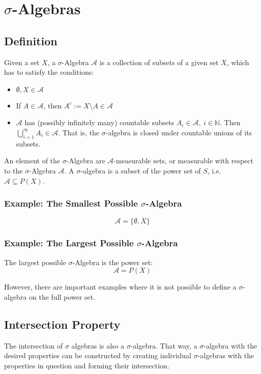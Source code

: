 \section{$\sigma$-Algebras}

\subsection{Definition}
Given a set $X$, a $\sigma$-Algebra $\mathscr{A}$ is a collection of subsets of a given set $X$, which has to satisfy the conditions:


\begin{itemize}
\item $\emptyset, X \in \mathscr{A}$
\item If $A\in\mathscr{A}$, then $A^c := X\setminus A \in \mathscr{A}$
\item $\mathscr{A}$ has (possibly infinitely many) countable subsets $A_i \in \mathscr{A},\ i \in \mathbb{N}$. Then $\bigcup_{i=1}^{\infty}A_i \in \mathscr{A}$. That is, the $\sigma$-algebra is closed under countable unions of its subsets. 
\end{itemize}

An element of the $\sigma$-Algebra are $\mathscr{A}$-measurable sets, or measurable with respect to the $\sigma$-Algebra $\mathscr{A}$. A $\sigma$-algebra is a subset of the power set of $S$, i.e. $\mathscr{A} \subseteq P(X)$. 

\subsubsection{Example: The Smallest Possible $\sigma$-Algebra}

\begin{equation}
\mathscr{A} = \{\emptyset, X\}
\end{equation}

\subsubsection{Example: The Largest Possible $\sigma$-Algebra} 
The largest possible $\sigma$-Algebra is the power set:
\begin{equation}
\mathscr{A} = P(X)
\end{equation}

However, there are important examples where it is not possible to define a $\sigma$-algebra on the full power set. 


\subsection{Intersection Property}
The intersection of $\sigma$ algebras is also a $\sigma$-algebra. That way, a $\sigma$-algebra with the desired properties can be constructed by creating individual $\sigma$-algebras with the properties in question and forming their intersection.

